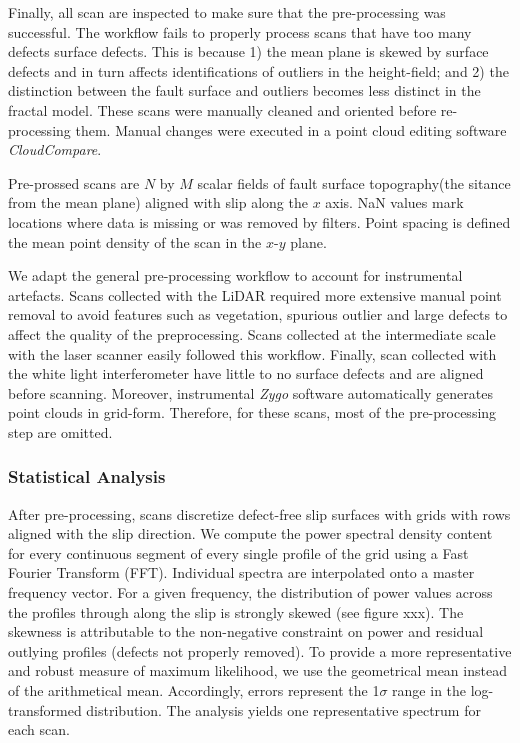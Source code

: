 \documentclass[12pt,a4paper]{article}
\begin{document}
Finally, all scan are inspected to make sure that the pre-processing was successful. The workflow fails to properly process scans that have too many defects surface defects. This is because 1) the mean plane is skewed by surface defects and in turn affects identifications of outliers in the height-field; and 2) the distinction between the fault surface and outliers becomes less distinct in the fractal model. These scans were manually cleaned and oriented before re-processing them. Manual changes were executed in a point cloud editing software \textit{CloudCompare}. 

Pre-prossed scans are $N$ by $M$ scalar fields of fault surface topography(the sitance from the mean plane) aligned with slip along the $x$ axis. NaN values mark locations where data is missing or was removed by filters. Point spacing is defined the mean point density of the scan in the $x$-$y$ plane.

We adapt the general pre-processing workflow to account for instrumental artefacts. Scans collected with the LiDAR required more extensive manual point removal to avoid features such as vegetation, spurious outlier and large defects to affect the quality of the preprocessing. Scans collected at the intermediate scale with the laser scanner easily followed this workflow. Finally, scan collected with the white light interferometer have little to no surface defects and are aligned before scanning. Moreover, instrumental \textit{Zygo} software automatically generates point clouds in grid-form. Therefore, for these scans, most of the pre-processing step are omitted.

	\subsubsection{Statistical Analysis}
		

After pre-processing, scans discretize defect-free slip surfaces with grids with rows aligned with the slip direction. We compute the power spectral density content for every continuous segment of every single profile of the grid using a Fast Fourier Transform (FFT). Individual spectra are interpolated onto a master frequency vector. For a given frequency, the distribution of power values across the profiles through along the slip is strongly skewed (see figure xxx). The skewness is attributable to the non-negative constraint on power and residual outlying profiles (defects not properly removed). To provide a more representative and robust measure of maximum likelihood, we use the geometrical mean instead of the arithmetical mean. Accordingly, errors represent the 1$\sigma$ range in the log-transformed distribution. The analysis yields one representative spectrum for each scan.
\end{document}
